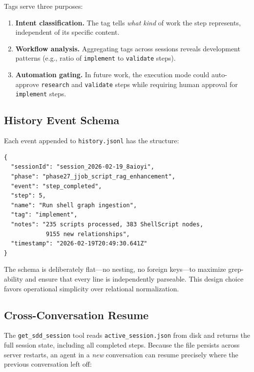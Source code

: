 \documentclass[11pt,letterpaper]{article}
\begin{document}
Tags serve three purposes:

\begin{enumerate}[nosep]
    \item \textbf{Intent classification.}  The tag tells \emph{what kind}
          of work the step represents, independent of its specific content.
    \item \textbf{Workflow analysis.}  Aggregating tags across sessions
          reveals development patterns (e.g., ratio of
          \texttt{implement} to \texttt{validate} steps).
    \item \textbf{Automation gating.}  In future work, the execution mode
          could auto-approve \texttt{research} and \texttt{validate}
          steps while requiring human approval for \texttt{implement}
          steps.
\end{enumerate}

\subsection{History Event Schema}

Each event appended to \texttt{history.jsonl} has the structure:

\begin{lstlisting}[language={},caption={History event for a step completion},label=lst:event]
{
  "sessionId": "session_2026-02-19_8aioyi",
  "phase": "phase27_jjob_script_rag_enhancement",
  "event": "step_completed",
  "step": 5,
  "name": "Run shell graph ingestion",
  "tag": "implement",
  "notes": "235 scripts processed, 383 ShellScript nodes,
            9155 new relationships",
  "timestamp": "2026-02-19T20:49:30.641Z"
}
\end{lstlisting}

The schema is deliberately flat---no nesting, no foreign keys---to
maximize grep-ability and ensure that every line is independently
parseable.  This design choice favors operational simplicity over
relational normalization.

\subsection{Cross-Conversation Resume}

The \texttt{get\_sdd\_session} tool reads \texttt{active\_session.json}
from disk and returns the full session state, including all completed
steps.  Because the file persists across server restarts, an agent in a
\emph{new} conversation can resume precisely where the previous
conversation left off:
\end{document}
